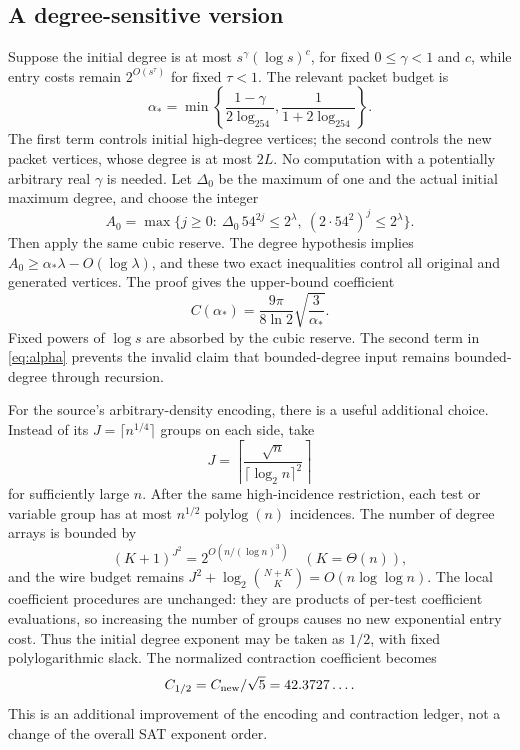 \documentclass[11pt]{article}
\theoremstyle{remark}\newtheorem{remark}[theorem]{Remark}
\newcommand{\polylog}{\operatorname{polylog}}
\newcommand{\Cnew}{C_{\rm new}}
\newcommand{\lp}{\log_2}
\begin{document}
\subsection{A degree-sensitive version}
Suppose the initial degree is at most $s^\gamma(\log s)^c$, for fixed $0\le\gamma<1$ and $c$, while entry costs remain $2^{O(s^\tau)}$ for fixed $\tau<1$. The relevant packet budget is
\begin{equation}
 \alpha_*=
 \min\left\{\frac{1-\gamma}{2\lp54},
              \frac1{1+2\lp54}\right\}.
 \label{eq:alpha}
\end{equation}
The first term controls initial high-degree vertices; the second controls the new packet vertices, whose degree is at most $2L$. No computation with a potentially arbitrary real $\gamma$ is needed. Let $\Delta_0$ be the maximum of one and the actual initial maximum degree, and choose the integer
\[
 A_0=\max\{j\ge0:\ \Delta_0\,54^{2j}\le2^\lambda,
                         \ (2\cdot54^2)^j\le2^\lambda\}.
\]
Then apply the same cubic reserve. The degree hypothesis implies $A_0\ge\alpha_*\lambda-O(\log\lambda)$, and these two exact inequalities control all original and generated vertices. The proof gives the upper-bound coefficient
\begin{equation}
 C(\alpha_*)=\frac{9\pi}{8\ln2}\sqrt{\frac3{\alpha_*}}.
 \label{eq:degree-constant}
\end{equation}
Fixed powers of $\log s$ are absorbed by the cubic reserve. The second term in \eqref{eq:alpha} prevents the invalid claim that bounded-degree input remains bounded-degree through recursion.

For the source's arbitrary-density encoding, there is a useful additional choice. Instead of its $J=\lceil n^{1/4}\rceil$ groups on each side, take
\[
 J=\left\lceil\frac{\sqrt n}{\lceil\lp n\rceil^2}\right\rceil
\]
for sufficiently large $n$. After the same high-incidence restriction, each test or variable group has at most $n^{1/2}\polylog(n)$ incidences. The number of degree arrays is bounded by
\[
 (K+1)^{J^2}=2^{O(n/(\log n)^3)}
 \quad(K=\Theta(n)),
\]
and the wire budget remains $J^2+\log_2\binom{N+K}{K}=O(n\log\log n)$. The local coefficient procedures are unchanged: they are products of per-test coefficient evaluations, so increasing the number of groups causes no new exponential entry cost. Thus the initial degree exponent may be taken as $1/2$, with fixed polylogarithmic slack. The normalized contraction coefficient becomes
\[
 C_{1/2}=\Cnew/\sqrt5=42.3727\ldots .
\]
This is an additional improvement of the encoding and contraction ledger, not a change of the overall SAT exponent order.
\end{document}
